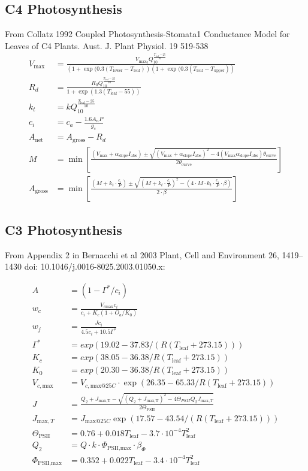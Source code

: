 \documentclass[10pt]{article}
\begin{document}
\subsection*{C4 Photosynthesis}
From Collatz 1992 Coupled Photosynthesis-Stomata1 Conductance Model for Leaves of C4 Plants. Aust. J. Plant Physiol. 19 519-538
\begin{align}
 V_\text{max}&=\frac{V_{\text{max}_0}Q_{10}^{\frac{T_\text{leaf}-25}{10}}}{\left(1+\exp(0.3(T_\text{lower}-T_\text{leaf})\right)\left(1+\exp(0.3(T_\text{leaf}-T_\text{upper})\right)}\\
 R_d&= \frac{R_0Q_{10}^{\frac{T_\text{leaf}-25}{10}}}{1+\exp(1.3(T_\text{leaf}-55))}\\
 k_t&=kQ_{10}^{\frac{T_\text{leaf}-25}{10}}\\
 c_i &=c_a-\frac{1.6A_nP}{g_s}\\
 A_\text{net}&=A_\text{gross}-R_d\\
 M &= \min\left[\frac{\scriptstyle(V_\text{max}+\alpha_{\text{slope}} I_\text{abs}) \pm \sqrt{(V_\text{max}+\alpha_\text{slope}I_\text{abs})^{2} - 4  (V_\text{max} \alpha_{\text{slope}}  I_\text{abs}) \theta_\text{curve}}}{2  \theta_\text{curve}}\right] \label{eqn:M} \\
  A_\text{gross} &= \min\left[ \frac{ \left( M + k_{t} \cdot \frac{c_{i}}{P} \right) \pm \sqrt{ \left(M + k_{t} \cdot \frac{c_{i}}{P} \right)^2 - \left( 4 \cdot M \cdot k_{t} \cdot \frac{c_{i}}{P} \cdot \beta \right)}}{2 \cdot \beta}\right] \label{eqn:Agross}
\end{align}
\newpage
\subsection*{C3 Photosynthesis}

From Appendix 2 in Bernacchi et al 2003 Plant, Cell and Environment 26, 1419–1430  doi: 10.1046/j.0016-8025.2003.01050.x:

\begin{align}
A &= \left(1-\Gamma^\ast/c_i\right) \\
w_c &= \frac{V_{c\text{max}}c_i}{c_i+K_c(1+O_a/K_0)}\\
w_j &= \frac{Jc_i}{4.5c_i + 10.5\Gamma^{*}}\\
\Gamma^\ast &= exp(19.02 - 37.83/(R(T_\text{leaf}+273.15)))\\
K_c &= exp(38.05-36.38/R(T_\text{leaf}+273.15))\\
K_0&=exp(20.30-36.38/R(T_\text{leaf}+273.15))\\
V_{c,\text{max}}&=V_{c,\text{max}@25C}\cdot \exp(26.35-65.33/R(T_\text{leaf}+273.15))\\
J&=\frac{Q_2+J_\text{max,T}-\sqrt{(Q_2+J_\text{max,T})^2-4\Theta_{PSII}Q_2J_{\text{max},T}}}{2\Theta_{\text{PSII}}}\\
J_{\text{max},T}&=J_{\text{max}@25C}\exp(17.57-43.54/(R(T_\text{leaf}+273.15))) \\
\Theta_\text{PSII} &= 0.76+0.018T_\text{leaf}-3.7\cdot10^{-4}T_\text{leaf}^2\\
Q_2&=Q\cdot k\cdot \Phi_\text{PSII,max}\cdot\beta_\Phi\\
\Phi_\text{PSII,max}&= 0.352 + 0.022T_\text{leaf} - 3.4\cdot10^{-4} T_\text{leaf}^2
\end{align}
\end{document}
